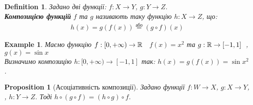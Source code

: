 \documentclass[a4paper, 14pt]{article}
\theoremstyle{theoremdd}
\theoremstyle{theoremdd}
\newtheorem{definition}[theorem]{Definition}
\theoremstyle{theoremdd}
\theoremstyle{theoremdd}
\newtheorem{example}[theorem]{Example}
\theoremstyle{theoremdd}
\newtheorem{proposition}[theorem]{Proposition}
\theoremstyle{theoremdd}
\theoremstyle{theoremdd}
\theoremstyle{theoremdd}
\begin{document}
	\begin{definition}
	Задано дві функції: $f: X \to Y$, $g: Y \to Z$.\\
	\textbf{Композицією функцій} $f$ та $g$ називають таку функцію $h: X \to Z$, що:
	\begin{align*}
	h(x) = g(f(x)) \overset{\text{або}}{=} (g \circ f) (x)
	\end{align*}
	\begin{figure}[H]
\end{figure}
	\end{definition}
	
	\begin{example}
	Маємо функцію $f: [0,+\infty) \to \mathbb{R} \hspace{0.2cm}$ $f(x) = x^2$ та $g: \mathbb{R} \to [-1,1] \hspace{0.2cm}$, $g(x) = \sin x$\\
	Визначимо композицію $h: [0,+\infty) \to [-1,1]$ так: $h(x) = g(f(x)) = \sin x^2$.
	\end{example}
	
	\begin{proposition}[Асоціативність композиції]
	Задано функції $f: W \to X$, \hspace{0.1cm} $g: X \to Y$, , \hspace{0.1cm} $h: Y \to Z$. Тоді $h \circ (g \circ f) = (h \circ g) \circ f$.
	\end{proposition}
	
\end{document}
